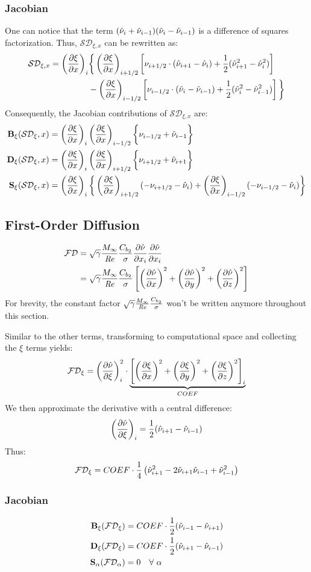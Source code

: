 \documentclass{SelimArticle}
\begin{document}
\subsubsection{Jacobian}
One can notice that the term $(\hat{\nu}_{i} + \hat{\nu}_{i-1})(\hat{\nu}_{i} - \hat{\nu}_{i-1})$ is a difference of squares
factorization. Thus, $\mathcal{SD}_{\xi,x}$ can be rewritten as:
\begin{align*}
    \mathcal{SD}_{\xi,x} =  \left(  \frac{\partial \xi}{\partial x}  \right) _i
& \bigg\{
    \left( \frac{\partial \xi}{\partial x} \right)_{i+1/2} \left[
        \nu_{i+1/2}\cdot (\hat{\nu}_{i+1} - \hat{\nu}_i) + \frac{1}{2}(\hat{\nu}_{i+1}^2 - \hat{\nu}_{i}^2)
    \right]
    \\
    & - \left( \frac{\partial \xi}{\partial x} \right)_{i-1/2} \left[
      \nu_{i-1/2}\cdot (\hat{\nu}_{i} - \hat{\nu}_{i-1}) + \frac{1}{2}(\hat{\nu}_{i}^2 - \hat{\nu}_{i-1}^2)
    \right]
\bigg\}
\end{align*}
Consequently, the Jacobian contributions of $\mathcal{SD}_{\xi,x}$ are:
\begin{align*}
    \mathbf{B}_\xi(\mathcal{SD}_\xi,x) &=
         \left(  \frac{\partial \xi}{\partial x}  \right)_i  \left(  \frac{\partial \xi}{\partial x}  \right)_{i-1/2} \bigg\{ \nu_{i-1/2} + \hat{\nu}_{i-1} \bigg\} \\
    \mathbf{D}_\xi(\mathcal{SD}_\xi,x) &=
         \left(  \frac{\partial \xi}{\partial x}  \right)_i  \left(  \frac{\partial \xi}{\partial x}  \right)_{i+1/2} \bigg\{ \nu_{i+1/2} + \hat{\nu}_{i+1} \bigg\} \\
    \mathbf{S}_\xi(\mathcal{SD}_\xi,x) &=
         \left(  \frac{\partial \xi}{\partial x}  \right)_i \bigg\{
             \left(  \frac{\partial \xi}{\partial x}  \right)_{i+1/2} ( -\nu_{i+1/2} - \hat{\nu}_{i})
          +  \left(  \frac{\partial \xi}{\partial x}  \right)_{i-1/2} ( -\nu_{i-1/2} - \hat{\nu}_{i})
        \bigg\}
\end{align*}

\subsection{First-Order Diffusion}
\begin{align*}
    \mathcal{FD} &=  \sqrt{\gamma}\frac{M_\infty}{\mathit{Re}}  \frac{C_{b_2}}{\sigma}  \frac{\partial \hat{\nu}}{\partial x_i}  \frac{\partial \hat{\nu}}{\partial x_i} \\
                 &=  \sqrt{\gamma}\frac{M_\infty}{\mathit{Re}}  \frac{C_{b_2}}{\sigma} \left[
        \left( \frac{\partial \hat{\nu}}{\partial x} \right)^2
        + \left( \frac{\partial \hat{\nu}}{\partial y} \right)^2
        + \left( \frac{\partial \hat{\nu}}{\partial z} \right)^2
    \right]
\end{align*}
For brevity, the constant factor $ \sqrt{\gamma}\frac{M_\infty}{\mathit{Re}}  \frac{C_{b_2}}{\sigma}$ won't be written anymore throughout
this section.

Similar to the other terms, transforming to computational space and collecting the $\xi$ terms
yields:
$$
    \mathcal{FD}_\xi = \left(  \frac{\partial \hat{\nu}}{\partial \xi}  \right)_i^2 \cdot \underbrace{\left[
        \left(  \frac{\partial \xi}{\partial x}  \right)^2
      + \left(  \frac{\partial \xi}{\partial y}  \right)^2
      + \left(  \frac{\partial \xi}{\partial z}  \right)^2
    \right]_i}_{COEF}
$$
We then approximate the derivative with a central difference:
$$
    \left(  \frac{\partial \hat{\nu}}{\partial \xi}  \right)_i = \frac{1}{2}( \hat{\nu}_{i+1} - \hat{\nu}_{i-1} )
$$
Thus:
$$
    \mathcal{FD}_\xi = COEF\cdot \frac{1}{4} \left(
        \hat{\nu}_{i+1}^2 - 2\hat{\nu}_{i+1}\hat{\nu}_{i-1} + \hat{\nu}_{i-1}^2
    \right)
$$

\subsubsection{Jacobian}
\begin{align*}
    \mathbf{B}_\xi(\mathcal{FD}_\xi) &= COEF\cdot\frac{1}{2}(\hat{\nu}_{i-1} - \hat{\nu}_{i+1})\\
    \mathbf{D}_\xi(\mathcal{FD}_\xi) &= COEF\cdot\frac{1}{2}(\hat{\nu}_{i+1} - \hat{\nu}_{i-1})\\
    \mathbf{S}_\alpha(\mathcal{FD}_\alpha) &= 0 \quad \forall ~ \alpha
\end{align*}
\end{document}
